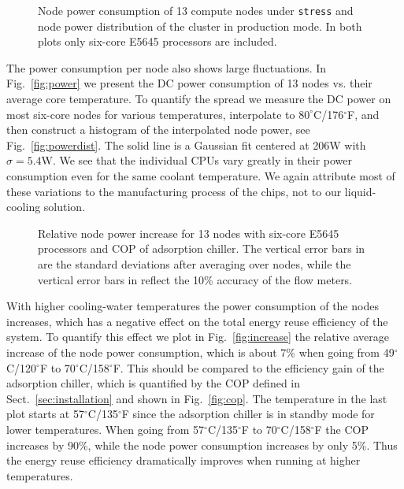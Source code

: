 \begin{figure}[t]
  \centering
  \hfill
  \vspace*{-3mm}
  \caption{ Node power consumption of 13 compute
    nodes under \texttt{stress} and  node power
    distribution of the cluster in production mode.  In both plots
    only six-core E5645 processors are included. }
\end{figure}

The power consumption per node also shows large fluctuations.  In
Fig.~\ref{fig:power} we present the DC power consumption of 13 nodes
vs.{} their average core temperature.  To quantify the spread we
measure the DC power on most six-core nodes for various temperatures,
interpolate to $80^\circ$C/176$^\circ$F, and then construct a
histogram of the interpolated node power, see
Fig.~\ref{fig:powerdist}.  The solid line is a Gaussian fit centered
at 206W with $\sigma=5.4$W.  We see that the individual CPUs vary
greatly in their power consumption even for the same coolant
temperature.  We again attribute most of these variations to the
manufacturing process of the chips, not to our liquid-cooling
solution.

\begin{figure}
  \centering
  \hfill
  \hfill
  \vspace*{-3mm}
  \caption{ Relative node power increase for 13
    nodes with six-core E5645 processors and  COP of
    adsorption chiller.  The vertical error bars in
     are the standard deviations after averaging
    over nodes, while the vertical error bars in 
    reflect the 10\% accuracy of the flow meters.}
\end{figure}

With higher cooling-water temperatures the power consumption of the
nodes increases, which has a negative effect on the total energy reuse
efficiency of the system.  To quantify this effect we plot in
Fig.~\ref{fig:increase} the relative average increase of the node
power consumption, which is about 7\% when going from
49$^\circ$C/120$^\circ$F to 70$^\circ$C/158$^\circ$F.  This should be
compared to the efficiency gain of the adsorption chiller, which is
quantified by the COP defined in Sect.~\ref{sec:installation} and
shown in Fig.~\ref{fig:cop}.  The temperature in the last plot starts
at 57$^\circ$C/135$^\circ$F since the adsorption chiller is in standby
mode for lower temperatures.  When going from 57$^\circ$C/135$^\circ$F
to 70$^\circ$C/158$^\circ$F the COP increases by 90\%, while the node
power consumption increases by only 5\%.  Thus the energy reuse
efficiency dramatically improves when running at higher temperatures.

